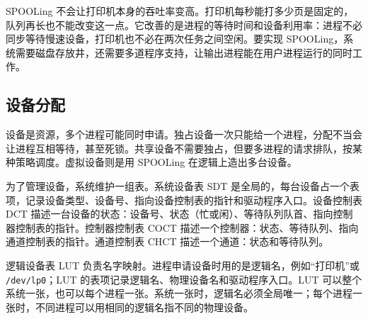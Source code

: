 SPOOLing 不会让打印机本身的吞吐率变高。打印机每秒能打多少页是固定的，队列再长也不能改变这一点。它改善的是进程的等待时间和设备利用率：进程不必同步等待慢速设备，打印机也不必在两次任务之间空闲。要实现 SPOOLing，系统需要磁盘存放井，还需要多道程序支持，让输出进程能在用户进程运行的同时工作。

\subsection{设备分配}

设备是资源，多个进程可能同时申请。独占设备一次只能给一个进程，分配不当会让进程互相等待，甚至死锁。共享设备不需要独占，但要多进程的请求排队，按某种策略调度。虚拟设备则是用 SPOOLing 在逻辑上造出多台设备。

为了管理设备，系统维护一组表。系统设备表 SDT 是全局的，每台设备占一个表项，记录设备类型、设备号、指向设备控制表的指针和驱动程序入口。设备控制表 DCT 描述一台设备的状态：设备号、状态（忙或闲）、等待队列队首、指向控制器控制表的指针。控制器控制表 COCT 描述一个控制器：状态、等待队列、指向通道控制表的指针。通道控制表 CHCT 描述一个通道：状态和等待队列。

逻辑设备表 LUT 负责名字映射。进程申请设备时用的是逻辑名，例如“打印机”或 \texttt{/dev/lp0}；LUT 的表项记录逻辑名、物理设备名和驱动程序入口。LUT 可以整个系统一张，也可以每个进程一张。系统一张时，逻辑名必须全局唯一；每个进程一张时，不同进程可以用相同的逻辑名指不同的物理设备。

